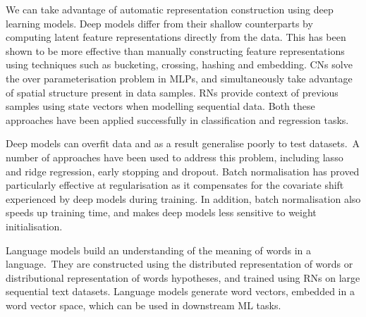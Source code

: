 \noindent We can take advantage of automatic representation construction using deep learning models. Deep models differ from their shallow counterparts by computing latent feature representations directly from the data. This has been shown to be more effective than manually constructing feature representations using techniques such as bucketing, crossing, hashing and embedding. CNs solve the over parameterisation problem in MLPs, and simultaneously take advantage of spatial structure present in data samples. RNs provide context of previous samples using state vectors when modelling sequential data. Both these approaches have been applied successfully in classification and regression tasks. \par

\noindent Deep models can overfit data and as a result generalise poorly to test datasets.\ A number of approaches have been used to address this problem, including lasso and ridge regression, early stopping and dropout. Batch normalisation has proved particularly effective at regularisation as it compensates for the covariate shift experienced by deep models during training. In addition, batch normalisation also speeds up training time, and makes deep models less sensitive to weight initialisation. \par

\noindent Language models build an understanding of the meaning of words in a language.\ They are constructed using the distributed representation of words or distributional representation of words hypotheses, and trained using RNs on large sequential text datasets. Language models generate word vectors, embedded in a word vector space, which can be used in downstream ML tasks. 
